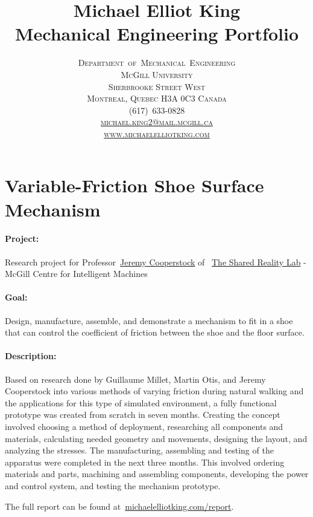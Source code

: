 \documentclass[12pt, landscape]{article}
\title{\Huge Michael Elliot King\\[10pt]
Mechanical Engineering Portfolio}
\author{\scshape Department~of~Mechanical~Engineering\\
\scshape McGill University\\
\normalfont 817 Sherbrooke Street West\\
Montreal, Quebec H3A 0C3 Canada\\[20pt]
(617)~633-0828\\
\href{mailto:michael.king2@mail.mcgill.ca}{michael.king2@mail.mcgill.ca}\\
\href{http://www.michaelelliotking.com}{www.michaelelliotking.com}
}
\date{}
\begin{document}
\begin{titlepage}
\linespread{1}\maketitle
\thispagestyle{empty}
\end{titlepage}


\pagestyle{fancy}

	\section{Variable-Friction Shoe Surface Mechanism}
		\paragraph{Project:} Research project for Professor~\href{http://www.cim.mcgill.ca/~jer/}{Jeremy Cooperstock} of~ \href{http://www.cim.mcgill.ca/sre}{The Shared Reality Lab} - McGill Centre for Intelligent Machines
		\paragraph{Goal:} Design, manufacture, assemble, and demonstrate a mechanism to fit in a shoe that can control the coefficient of friction between the shoe and the floor surface.
		\paragraph{Description:} Based on research done by Guillaume Millet, Martin Otis, and Jeremy Cooperstock into various methods of varying friction during natural walking and the applications for this type of simulated environment, a fully functional prototype was created from scratch in seven months.  Creating the concept involved choosing a method of deployment, researching all components and materials, calculating needed geometry and movements, designing the layout, and analyzing the stresses.  The manufacturing, assembling and testing of the apparatus were completed in the next three months. This involved ordering materials and parts, machining and assembling components, developing the power and control system, and testing the mechanism prototype.  

		The full report can be found at~\href{http://michaelelliotking.com/report}{michaelelliotking.com/report}.
\end{document}
